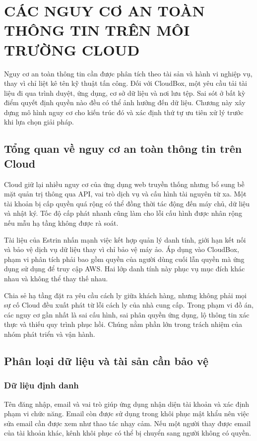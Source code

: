 \chapter{CÁC NGUY CƠ AN TOÀN THÔNG TIN TRÊN MÔI TRƯỜNG CLOUD}
\label{chap:nguyco}
Nguy cơ an toàn thông tin cần được phân tích theo tài sản và hành vi nghiệp vụ, thay vì chỉ liệt kê tên kỹ thuật tấn công. Đối với CloudBox, một yêu cầu tải tài liệu đi qua trình duyệt, ứng dụng, cơ sở dữ liệu và nơi lưu tệp. Sai sót ở bất kỳ điểm quyết định quyền nào đều có thể ảnh hưởng đến dữ liệu. Chương này xây dựng mô hình nguy cơ cho kiến trúc đó và xác định thứ tự ưu tiên xử lý trước khi lựa chọn giải pháp.

\section{Tổng quan về nguy cơ an toàn thông tin trên Cloud}
Cloud giữ lại nhiều nguy cơ của ứng dụng web truyền thống nhưng bổ sung bề mặt quản trị thông qua API, vai trò dịch vụ và cấu hình tài nguyên từ xa. Một tài khoản bị cấp quyền quá rộng có thể đồng thời tác động đến máy chủ, dữ liệu và nhật ký. Tốc độ cấp phát nhanh cũng làm cho lỗi cấu hình được nhân rộng nếu mẫu hạ tầng không được rà soát.

Tài liệu của Estrin nhấn mạnh việc kết hợp quản lý danh tính, giới hạn kết nối và bảo vệ dịch vụ dữ liệu thay vì chỉ bảo vệ máy ảo. Áp dụng vào CloudBox, phạm vi phân tích phải bao gồm quyền của người dùng cuối lẫn quyền mà ứng dụng sử dụng để truy cập AWS. Hai lớp danh tính này phục vụ mục đích khác nhau và không thể thay thế nhau.\cite{estrin}

Chia sẻ hạ tầng đặt ra yêu cầu cách ly giữa khách hàng, nhưng không phải mọi sự cố Cloud đều xuất phát từ lỗi cách ly của nhà cung cấp. Trong phạm vi đồ án, các nguy cơ gần nhất là sai cấu hình, sai phân quyền ứng dụng, lộ thông tin xác thực và thiếu quy trình phục hồi. Chúng nằm phần lớn trong trách nhiệm của nhóm phát triển và vận hành.

\section{Phân loại dữ liệu và tài sản cần bảo vệ}
\subsection{Dữ liệu định danh}
Tên đăng nhập, email và vai trò giúp ứng dụng nhận diện tài khoản và xác định phạm vi chức năng. Email còn được sử dụng trong khôi phục mật khẩu nên việc sửa email cần được xem như thao tác nhạy cảm. Nếu một người thay được email của tài khoản khác, kênh khôi phục có thể bị chuyển sang người không có quyền.

